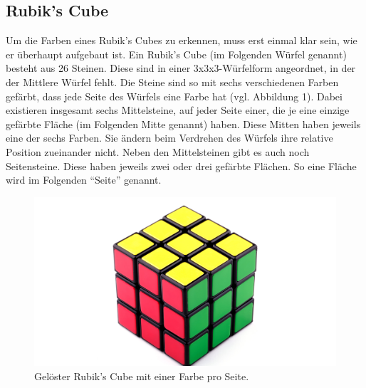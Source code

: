 \documentclass[a4paper, 12pt]{article}
\begin{document}
\subsection{Rubik's Cube}
Um die Farben eines Rubik's Cubes zu erkennen, muss erst einmal klar sein, wie er überhaupt aufgebaut ist. Ein Rubik's Cube (im Folgenden Würfel genannt) besteht aus 26 Steinen. Diese sind in einer 3x3x3-Würfelform angeordnet, in der der Mittlere Würfel fehlt. Die Steine sind so mit sechs verschiedenen Farben gefärbt, dass jede Seite des Würfels eine Farbe hat (vgl. Abbildung 1). Dabei existieren insgesamt sechs Mittelsteine, auf jeder Seite einer, die je eine einzige gefärbte Fläche (im Folgenden Mitte genannt) haben. Diese Mitten haben jeweils eine der sechs Farben. Sie ändern beim Verdrehen des Würfels ihre relative Position zueinander nicht. Neben den Mittelsteinen gibt es auch noch Seitensteine. Diese haben jeweils zwei oder drei gefärbte Flächen. So eine Fläche wird im Folgenden "`Seite"' genannt.
\begin{figure}[H]
\includegraphics[scale=1.5]{Wuerfel_Billd}
\caption{Gelöster Rubik's Cube mit einer Farbe pro Seite. \cite{Wuerfelbild}}
\end{figure}
\end{document}
